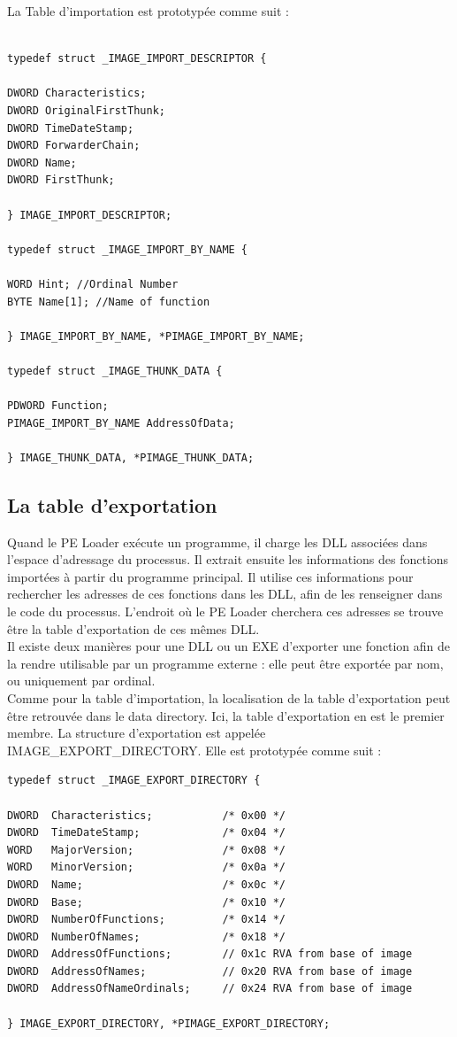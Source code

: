La Table d'importation est prototypée comme suit :
\begin{lstlisting}

typedef struct _IMAGE_IMPORT_DESCRIPTOR {

DWORD Characteristics; 
DWORD OriginalFirstThunk; 
DWORD TimeDateStamp; 
DWORD ForwarderChain; 
DWORD Name; 
DWORD FirstThunk; 

} IMAGE_IMPORT_DESCRIPTOR;

typedef struct _IMAGE_IMPORT_BY_NAME {

WORD Hint; //Ordinal Number
BYTE Name[1]; //Name of function

} IMAGE_IMPORT_BY_NAME, *PIMAGE_IMPORT_BY_NAME;

typedef struct _IMAGE_THUNK_DATA {

PDWORD Function;
PIMAGE_IMPORT_BY_NAME AddressOfData;

} IMAGE_THUNK_DATA, *PIMAGE_THUNK_DATA;
\end{lstlisting}
\subsection{La table d'exportation}
Quand le PE Loader exécute un programme, il charge les DLL associées dans l'espace d'adressage du processus. Il extrait ensuite les informations des fonctions importées à partir du programme principal. Il utilise ces informations pour rechercher les adresses de ces fonctions dans les DLL, afin de les renseigner dans le code du processus. L'endroit où le PE Loader cherchera ces adresses se trouve être la table d'exportation de ces mêmes DLL.\\
Il existe deux manières pour une DLL ou un EXE d'exporter une fonction afin de la rendre utilisable par un programme externe : elle peut être exportée par nom, ou uniquement par ordinal.\\
Comme pour la table d'importation, la localisation de la table d'exportation peut être retrouvée dans le data directory. Ici, la table d'exportation en est le premier membre. La structure d'exportation est appelée IMAGE\_EXPORT\_DIRECTORY. Elle est prototypée comme suit :
\begin{lstlisting}
typedef struct _IMAGE_EXPORT_DIRECTORY {

DWORD  Characteristics;           /* 0x00 */
DWORD  TimeDateStamp;             /* 0x04 */
WORD   MajorVersion;              /* 0x08 */
WORD   MinorVersion;              /* 0x0a */
DWORD  Name;                      /* 0x0c */
DWORD  Base;                      /* 0x10 */
DWORD  NumberOfFunctions;         /* 0x14 */
DWORD  NumberOfNames;             /* 0x18 */
DWORD  AddressOfFunctions;        // 0x1c RVA from base of image
DWORD  AddressOfNames;            // 0x20 RVA from base of image
DWORD  AddressOfNameOrdinals;     // 0x24 RVA from base of image

} IMAGE_EXPORT_DIRECTORY, *PIMAGE_EXPORT_DIRECTORY;
\end{lstlisting}
